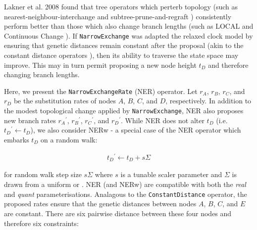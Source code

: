 \documentclass[10pt,letterpaper]{article}
\begin{document}
Lakner et al. 2008 \cite{lakner2008efficiency} found that tree operators which perterb topology (such as nearest-neighbour-interchange and subtree-prune-and-regraft \cite{semple2003phylogenetics}) consistently perform better than those which also change branch lengths (such as LOCAL \cite{simon1998local} and Continuous Change \cite{jow2002bayesian}). 
If \texttt{NarrowExchange} was adapted the relaxed clock model by ensuring that genetic distances remain constant after the proposal (akin to the constant distance operators \cite{zhang2020improving}), then its ability to traverse the state space may improve. 
This may in turn permit proposing a new node height $t_D$ and therefore changing branch lengths.



Here, we present the \texttt{NarrowExchangeRate} (NER) operator. 
Let $r_A$, $r_B$, $r_C$, and $r_D$ be the substitution rates of nodes $A$, $B$, $C$, and $D$, respectively. 
In addition to the modest topological change applied by \texttt{NarrowExchange}, NER also proposes new branch rates ${r_A}^\prime$, ${r_B}^\prime$, ${r_C}^\prime$, and ${r_D}^\prime$. While NER does not alter $t_D$ (i.e. ${t_D}^\prime \leftarrow t_D$), we also consider NERw - a special case of the NER operator which embarks $t_D$ on a random walk:

\begin{align}
	{t_D}^\prime \leftarrow t_D + s\Sigma
\end{align}

for random walk step size $s\Sigma$ where $s$ is a tunable scaler parameter and $\Sigma$ is drawn from a uniform or \textbf{}. NER (and NERw) are compatible with both the \textit{real} and \textit{quant} parameterisations. 
Analagous to the \texttt{ConstantDistance} operator, the proposed rates ensure that the genetic distances between nodes $A$, $B$, $C$, and $E$ are constant. 
There are six pairwise distance between these four nodes and therefore six constraints:
\end{document}
